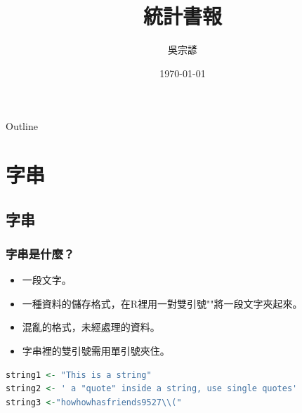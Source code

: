 \documentclass[utf8]{beamer}
\begin{document}
\begin{CJK}{UTF8}{bsmi}

\title[統計書報]{統計書報}
\author[吳宗諺]{吳宗諺}

\date{\today}

\begin{frame}
\titlepage
\end{frame}

\begin{frame}{Outline}
\tableofcontents
\end{frame}

\section{字串}
\subsection{字串}
\begin{frame}[fragile]
\frametitle{字串是什麼？}
\begin{itemize}
\item 一段文字。
\item 一種資料的儲存格式，在R裡用一對雙引號""將一段文字夾起來。
\item 混亂的格式，未經處理的資料。
\item 字串裡的雙引號需用單引號夾住。
\end{itemize}
\begin{lstlisting}[language=R,identifierstyle=\color{blue},stringstyle=\color{orange},keywordstyle=\color{green!60!black}\bfseries]
string1 <- "This is a string"
string2 <- ' a "quote" inside a string, use single quotes'
string3 <-"howhowhasfriends9527\\("
\end{lstlisting}
\end{frame}



\end{CJK}
\end{document}
